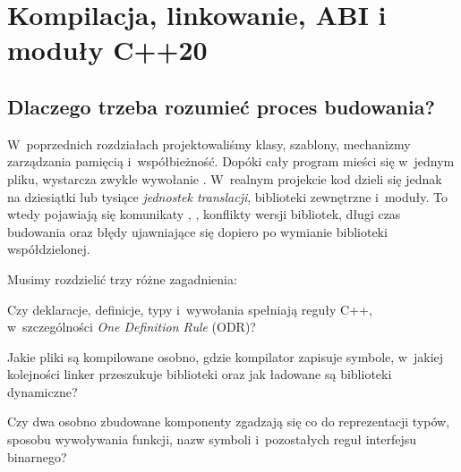 
\chapter{Kompilacja, linkowanie, ABI i moduły C++20}
\label{chap:cpp17-build-abi-modules}

\section{Dlaczego trzeba rozumieć proces budowania?}

W~poprzednich rozdziałach projektowaliśmy klasy, szablony, mechanizmy
zarządzania pamięcią i~współbieżność. Dopóki cały program mieści się
w~jednym pliku, wystarcza zwykle wywołanie .
W~realnym projekcie kod dzieli się jednak na dziesiątki lub tysiące
\emph{jednostek translacji}, biblioteki zewnętrzne i~moduły. To wtedy
pojawiają się komunikaty , ,
konflikty wersji bibliotek, długi czas budowania oraz błędy ujawniające
się dopiero po wymianie biblioteki współdzielonej.

Musimy rozdzielić trzy różne zagadnienia:
\begin{description}[style=nextline]
\item[Poprawność programu w~języku C++]
Czy deklaracje, definicje, typy i~wywołania spełniają reguły C++,
w~szczególności \emph{One Definition Rule} (ODR)?
\item[Model budowania i~linkowania]
Jakie pliki są kompilowane osobno, gdzie kompilator zapisuje symbole,
w~jakiej kolejności linker przeszukuje biblioteki oraz jak ładowane są
biblioteki dynamiczne?
\item[Zgodność binarna (ABI)]
Czy dwa osobno zbudowane komponenty zgadzają się co do reprezentacji
typów, sposobu wywoływania funkcji, nazw symboli i~pozostałych reguł
interfejsu binarnego?
\end{description}


